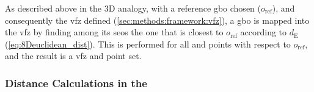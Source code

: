 \documentclass[final,twocolumn,12pt]{elsarticle}
\begin{document}
As described above in the 3D analogy, with a reference \gls{gbo} chosen ($o_{\text{ref}}$), and consequently the \gls{vfz} defined (\cref{sec:methods:framework:vfz}), a \gls{gbo} is mapped into the \gls{vfz} by finding among its \glspl{seo} the one that is closest to $o_{\text{ref}}$ according to $d_{\text{E}}$ (\cref{eq:8Deuclidean_dist}). This is performed for all \inpt{} and \outpt{} points with respect to $o_{\text{ref}}$, and the result is a \gls{vfz} \inpt{} and \outpt{} point set.


\subsubsection{Distance Calculations in the }
\label{sec:methods:framework:vfz-dist}
\end{document}
